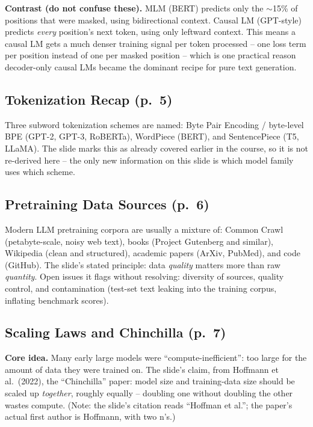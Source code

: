 \documentclass[11pt]{article}
\begin{document}
\textbf{Contrast (do not confuse these).} MLM (BERT) predicts only the $\sim$15\% of positions that were masked, using bidirectional context. Causal LM (GPT-style) predicts \emph{every} position's next token, using only leftward context. This means a causal LM gets a much denser training signal per token processed -- one loss term per position instead of one per masked position -- which is one practical reason decoder-only causal LMs became the dominant recipe for pure text generation.

\subsection{Tokenization Recap (p.\ 5)}

Three subword tokenization schemes are named: Byte Pair Encoding / byte-level BPE (GPT-2, GPT-3, RoBERTa), WordPiece (BERT), and SentencePiece (T5, LLaMA). The slide marks this as already covered earlier in the course, so it is not re-derived here -- the only new information on this slide is which model family uses which scheme.

\subsection{Pretraining Data Sources (p.\ 6)}

Modern LLM pretraining corpora are usually a mixture of: Common Crawl (petabyte-scale, noisy web text), books (Project Gutenberg and similar), Wikipedia (clean and structured), academic papers (ArXiv, PubMed), and code (GitHub). The slide's stated principle: data \emph{quality} matters more than raw \emph{quantity}. Open issues it flags without resolving: diversity of sources, quality control, and contamination (test-set text leaking into the training corpus, inflating benchmark scores).

\subsection{Scaling Laws and Chinchilla (p.\ 7)}

\textbf{Core idea.} Many early large models were ``compute-inefficient'': too large for the amount of data they were trained on. The slide's claim, from Hoffmann et al.\ (2022), the ``Chinchilla'' paper: model size and training-data size should be scaled up \emph{together}, roughly equally -- doubling one without doubling the other wastes compute. (Note: the slide's citation reads ``Hoffman et al.''; the paper's actual first author is Hoffmann, with two n's.)
\end{document}
